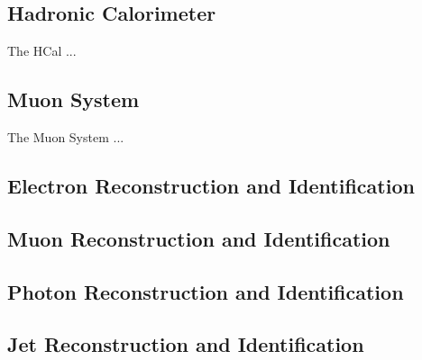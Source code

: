 \subsection{Hadronic Calorimeter}
\label{sec:HCal}

The HCal ...

\subsection{Muon System}
\label{sec:Muon System}

The Muon System ...

\subsection{Electron Reconstruction and Identification}
\label{sec:HZZ4lelectrons}

\subsection{Muon Reconstruction and Identification}
\label{sec:HZZ4lmuons}

\subsection{Photon Reconstruction and Identification}
\label{sec:HZZ4lphotons}

\subsection{Jet Reconstruction and Identification}
\label{sec:HZZ4ljets}
